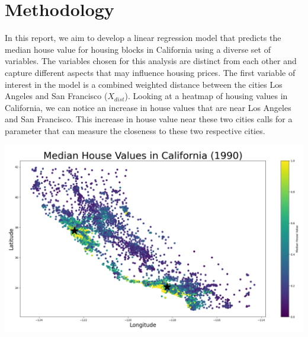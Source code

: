 \documentclass[10pt]{article}
\begin{document}
\section{Methodology}
In this report, we aim to develop a linear regression model that predicts the median house value for housing blocks in California 
using a diverse set of variables. 
The variables chosen for this analysis are distinct from each other and capture different aspects that may influence housing prices. The first variable
of interest in the model is a combined weighted distance between the cities Los Angeles and San Francisco ($X_{dist}$). Looking at a heatmap of 
housing values in California,
we can notice an increase in house values that are near Los Angeles and San Francisco. This increase in house value near these two cities
calls for a parameter that can measure the closeness to these two respective cities.
\begin{center}
\includegraphics[scale=0.35]{Figure_1}
\end{center}
\end{document}
